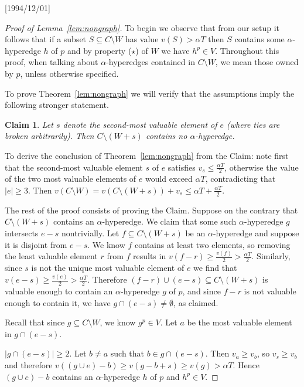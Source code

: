 \NeedsTeXFormat{LaTeX2e}[1994/12/01]\documentclass[letterpaper, 11pt]{article}
\newtheorem*{claim}{Claim}
\theoremstyle{definition}
\theoremstyle{remark}
\numberwithin{equation}{section}
\begin{document}
\begin{proof}[Proof of Lemma~\ref{lem:nongraph}]
To begin we observe that from our setup it follows that if a subset $S
\subseteq C\setminus W$ has value $v(S) > \alpha T$ then $S$ contains some
$\alpha$-hyperedge $h$ of $p$ and by property ($\star$) of $W$ we have
$h^p \in V$. Throughout this proof,
when talking about
$\alpha$-hyperedges contained in $C\setminus W$, we mean those owned
by $p$, unless otherwise specified.

To prove Theorem~\ref{lem:nongraph} we will verify that the
  assumptions imply the following
stronger statement.

\begin{claim}
Let  $s$ denote the second-most valuable element
  of $e$ (where ties are broken arbitrarily). Then $C\setminus (W+s)$
  contains no   $\alpha$-hyperedge. 
\end{claim}

To derive the conclusion of Theorem~\ref{lem:nongraph} from the Claim:
note first that 
the second-most valuable element $s$ of $e$ satisfies
$v_s\leq \frac{\alpha T}{2}$, otherwise the value of the two most valuable elements
of $e$ would exceed $\alpha T$, contradicting that $|e| \geq 3$. 
Then $v(C\setminus W) = v(C\setminus (W+s)) + v_s \leq \alpha T + \frac{\alpha T}{2}$.

The rest of the proof consists of proving the Claim.
Suppose on the contrary that $C\setminus (W+s)$ contains an
$\alpha$-hyperedge. We claim that some such $\alpha$-hyperedge $g$
intersects $e-s$ nontrivially. Let $f \subseteq C\setminus (W+s)$ be an
$\alpha$-hyperedge and suppose it is disjoint from  $e-s$. We know $f$ contains at
least two elements, so removing the least valuable element $r$ from
$f$ results in $v(f-r)\geq \frac{v(f)}{2}> \frac{\alpha T}{2}$. Similarly, since $s$ is not
the unique most valuable element of $e$ we 
find that $v(e-s)\geq \frac{v(e)}{2}>\frac{\alpha T}{2}$. Therefore $(f-r)\cup (e-s)
\subseteq C\setminus (W +s)$ is
valuable enough to contain an $\alpha$-hyperedge $g$ of $p$, and
since $f-r$ is not valuable enough to contain it, we have $g\cap (e-s) \neq
\emptyset$, as claimed. 

Recall that since $g \subseteq C\setminus W$, we know $g^p \in V$. 
Let $a$ be the most valuable element in $g\cap (e-s)$.

\medskip

 $|g\cap (e-s)| \geq 2$. Let $b\neq a$ such that $b\in g \cap (e-s)$. 
Then $v_a\geq v_b$, so $v_s\geq v_b$ and therefore
$v((g\cup e) -b) \geq v(g - b +s) \geq v(g) > \alpha T$. Hence
$(g \cup e )- b$ contains an $\alpha$-hyperedge $h$ of $p$ and
$h^p\in V$.


\end{proof}
\end{document}
